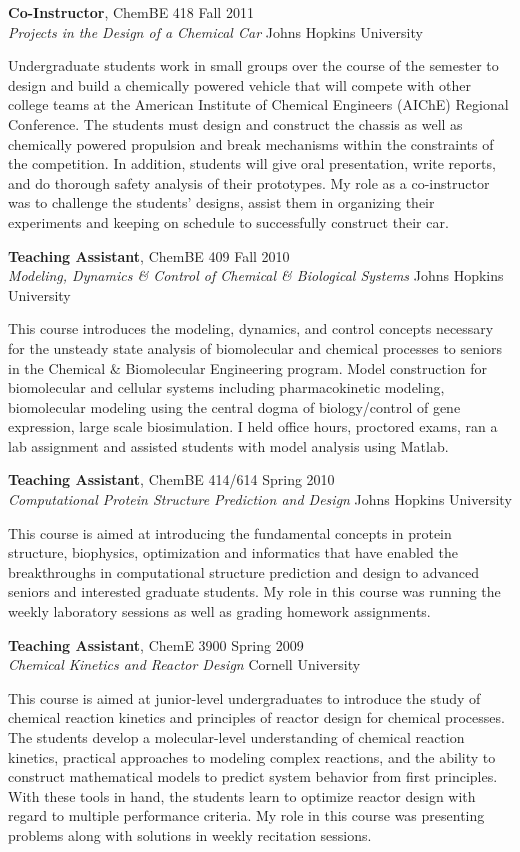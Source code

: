 \documentclass[12pt]{article}
\newcommand{\tworowstwocolsitem}[4]{
{#1} \hfill {#2} \\
{#3} \hfill {#4} \\
\vspace{-0.5\baselineskip}\par}
\newcommand{\teachingitem}[4]{
\tworowstwocolsitem{#1}{#2}{\textit{#3}}{#4}}
\begin{document}
\teachingitem{\textbf{Co-Instructor}, ChemBE 418}{Fall 2011}{Projects in the Design of a Chemical Car}{Johns Hopkins University}
Undergraduate students work in small groups over the course of the semester to design and build a chemically powered vehicle that will compete with other college teams at the American Institute of Chemical Engineers (AIChE) Regional Conference. 
The students must design and construct the chassis as well as chemically powered propulsion and break mechanisms within the constraints of the competition. In addition, students will give oral presentation, write reports, and do thorough safety analysis of their prototypes.
My role as a co-instructor was to challenge the students' designs, assist them in organizing their experiments and keeping on schedule to successfully construct their car.\par\vspace{\baselineskip}

\teachingitem{\textbf{Teaching Assistant}, ChemBE 409}{Fall 2010}{Modeling, Dynamics \& Control of Chemical \& Biological Systems}{Johns Hopkins University}
This course introduces the modeling, dynamics, and control concepts necessary for the unsteady state analysis of biomolecular and chemical processes to seniors in the Chemical \& Biomolecular Engineering program.
Model construction for biomolecular and cellular systems including pharmacokinetic modeling, biomolecular modeling using the central dogma of biology/control of gene expression, large scale biosimulation.
I held office hours, proctored exams, ran a lab assignment and assisted students with model analysis using Matlab.\par\vspace{\baselineskip}

\teachingitem{\textbf{Teaching Assistant}, ChemBE 414/614}{Spring 2010}{Computational Protein Structure Prediction and Design}{Johns Hopkins University}
This course is aimed at introducing the fundamental concepts in protein structure, biophysics, optimization and informatics that have enabled the breakthroughs in computational structure prediction and design to advanced seniors and interested graduate students.
My role in this course was running the weekly laboratory sessions as well as grading homework assignments.\par\vspace{\baselineskip}

\teachingitem{\textbf{Teaching Assistant}, ChemE 3900}{Spring 2009}{Chemical Kinetics and Reactor Design}{Cornell University}
This course is aimed at junior-level undergraduates to introduce the study of chemical reaction kinetics and principles of reactor design for chemical processes.
The students develop a molecular-level understanding of chemical reaction kinetics, practical approaches to modeling complex reactions, and the ability to construct mathematical models to predict system behavior from first principles.
With these tools in hand, the students learn to optimize reactor design with regard to multiple performance criteria.
My role in this course was presenting problems along with solutions in weekly recitation sessions.\par\vspace{\baselineskip}
\end{document}
